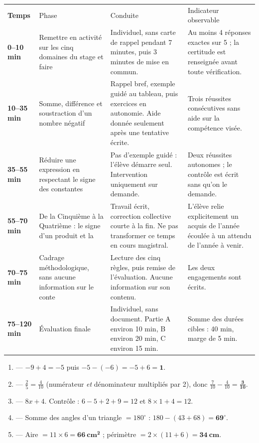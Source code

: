 \documentclass[10pt,a4paper]{article}
\begin{document}
\par\noindent\begin{tabularx}{\linewidth}{>{\bfseries}p{18mm} p{34mm} X X}
\rowcolor{Navy}\color{white}Temps & \color{white}Phase & \color{white}Conduite & \color{white}Indicateur observable \\
0--10 min & Remettre en activité sur les cinq domaines du stage et faire & Individuel, sans carte de rappel pendant 7 minutes, puis 3 minutes de mise en commun. & Au moins 4 réponses exactes sur 5 ; la certitude est renseignée avant toute vérification. \\
10--35 min & Somme, différence et soustraction d'un nombre négatif & Rappel bref, exemple guidé au tableau, puis exercices en autonomie. Aide donnée seulement après une tentative écrite. & Trois réussites consécutives sans aide sur la compétence visée. \\
35--55 min & Réduire une expression en respectant le signe des constantes & Pas d'exemple guidé : l'élève démarre seul. Intervention uniquement sur demande. & Deux réussites autonomes ; le contrôle est écrit sans qu'on le demande. \\
55--70 min & De la Cinquième à la Quatrième : le signe d'un produit et la & Travail écrit, correction collective courte à la fin. Ne pas transformer ce temps en cours magistral. & L'élève relie explicitement un acquis de l'année écoulée à un attendu de l'année à venir. \\
70--75 min & Cadrage méthodologique, sans aucune information sur le conte & Lecture des cinq règles, puis remise de l'évaluation. Aucune information sur son contenu. & Les deux engagements sont écrits. \\
75--120 min & Évaluation finale & Individuel, sans document. Partie A environ 10 min, B environ 20 min, C environ 15 min. & Somme des durées cibles : 40 min, marge de 5 min. \\
\end{tabularx}
\newpage{}
\begin{enumerate}
\item {} --- $-9+4=-5$ puis $-5-(-6)=-5+6=\mathbf{1}$.
\item {} --- $\frac{2}{5}=\frac{4}{10}$ (numérateur \emph{et} dénominateur multipliés par 2), donc $\frac{7}{10}-\frac{4}{10}=\mathbf{\frac{3}{10}}$.
\item {} --- $8x+4$. Contrôle : $6-5+2+9=12$ et $8\times 1+4=12$.
\item {} --- Somme des angles d'un triangle $=180^\circ$ : $180-(43+68)=\mathbf{69^\circ}$.
\item {} --- Aire $=11\times 6=\mathbf{66\ \text{cm}^2}$ ; périmètre $=2\times(11+6)=\mathbf{34\ \text{cm}}$.
\end{enumerate}
\end{document}
